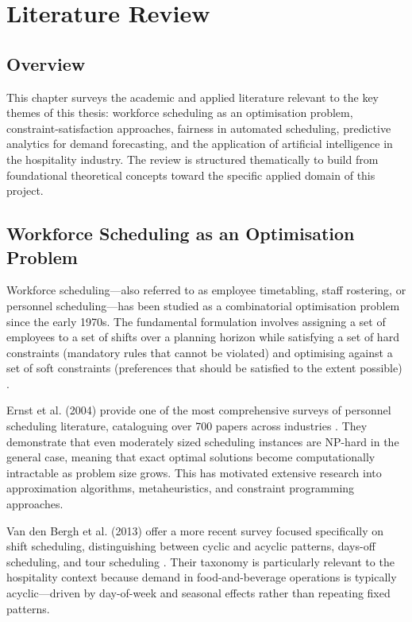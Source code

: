 \documentclass[12pt,a4paper]{report}
\begin{document}
\chapter{Literature Review}

\section{Overview}

This chapter surveys the academic and applied literature relevant to the key themes of this thesis: workforce scheduling as an optimisation problem, constraint-satisfaction approaches, fairness in automated scheduling, predictive analytics for demand forecasting, and the application of artificial intelligence in the hospitality industry. The review is structured thematically to build from foundational theoretical concepts toward the specific applied domain of this project.

\section{Workforce Scheduling as an Optimisation Problem}

Workforce scheduling—also referred to as employee timetabling, staff rostering, or personnel scheduling—has been studied as a combinatorial optimisation problem since the early 1970s. The fundamental formulation involves assigning a set of employees to a set of shifts over a planning horizon while satisfying a set of hard constraints (mandatory rules that cannot be violated) and optimising against a set of soft constraints (preferences that should be satisfied to the extent possible) \cite{ernst_et_al_2004}.

Ernst et al. (2004) provide one of the most comprehensive surveys of personnel scheduling literature, cataloguing over 700 papers across industries \cite{ernst_et_al_2004}. They demonstrate that even moderately sized scheduling instances are NP-hard in the general case, meaning that exact optimal solutions become computationally intractable as problem size grows. This has motivated extensive research into approximation algorithms, metaheuristics, and constraint programming approaches.

Van den Bergh et al. (2013) offer a more recent survey focused specifically on shift scheduling, distinguishing between cyclic and acyclic patterns, days-off scheduling, and tour scheduling \cite{van_den_bergh_2013}. Their taxonomy is particularly relevant to the hospitality context because demand in food-and-beverage operations is typically acyclic—driven by day-of-week and seasonal effects rather than repeating fixed patterns.
\end{document}
